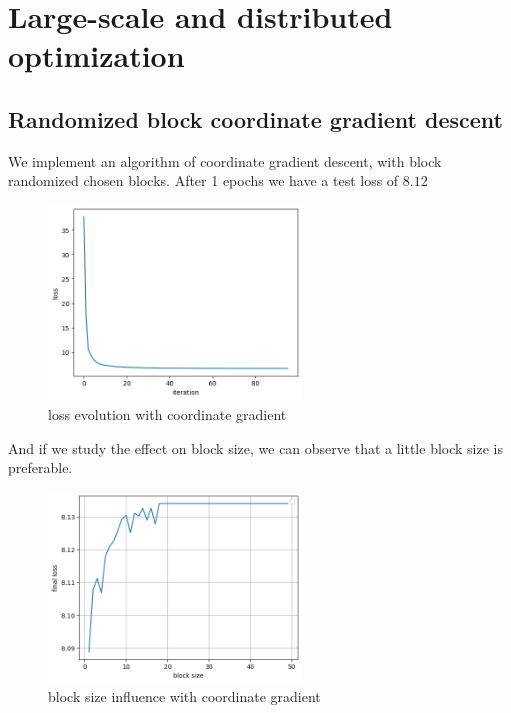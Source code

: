 \documentclass{article}
\begin{document}
\section{Large-scale and distributed optimization}

    \subsection{Randomized block coordinate gradient descent}

        We implement an algorithm of coordinate gradient descent, with block randomized chosen blocks. After 1 epochs we have a test loss of $8.12$

    \begin{figure}[!h]
    \centering
    \includegraphics[width=0.6\textwidth]{images/part6_1.png}
    \caption{loss evolution with coordinate gradient}
    \label{fig:sg3}
    \end{figure}  

    And if we study the effect on block size, we can observe that a little block size is preferable.

    \begin{figure}[!h]
    \centering
    \includegraphics[width=0.6\textwidth]{images/part6_2.png}
    \caption{block size influence with coordinate gradient}
    \label{fig:sg3}
    \end{figure}  
\end{document}

